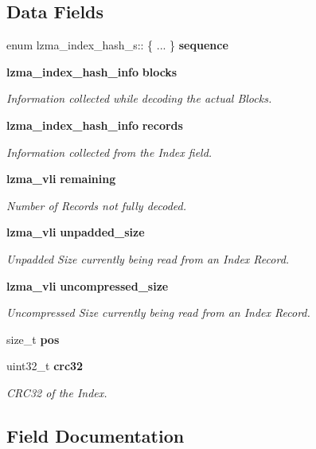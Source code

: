 \subsection*{Data Fields}
\begin{DoxyCompactItemize}
\item 
enum lzma\-\_\-index\-\_\-hash\-\_\-s\-:: \{ ... \}  {\bfseries sequence}\label{structlzma__index__hash__s_aa3d3ed57a6b0d9162ce567fa09eb57e7}

\item 
{\bf lzma\-\_\-index\-\_\-hash\-\_\-info} {\bf blocks}
\begin{DoxyCompactList}\small\item\em Information collected while decoding the actual Blocks. \end{DoxyCompactList}\item 
{\bf lzma\-\_\-index\-\_\-hash\-\_\-info} {\bf records}
\begin{DoxyCompactList}\small\item\em Information collected from the Index field. \end{DoxyCompactList}\item 
{\bf lzma\-\_\-vli} {\bf remaining}
\begin{DoxyCompactList}\small\item\em Number of Records not fully decoded. \end{DoxyCompactList}\item 
{\bf lzma\-\_\-vli} {\bf unpadded\-\_\-size}
\begin{DoxyCompactList}\small\item\em Unpadded Size currently being read from an Index Record. \end{DoxyCompactList}\item 
{\bf lzma\-\_\-vli} {\bf uncompressed\-\_\-size}
\begin{DoxyCompactList}\small\item\em Uncompressed Size currently being read from an Index Record. \end{DoxyCompactList}\item 
size\-\_\-t {\bf pos}
\item 
uint32\-\_\-t {\bf crc32}
\begin{DoxyCompactList}\small\item\em C\-R\-C32 of the Index. \end{DoxyCompactList}\end{DoxyCompactItemize}


\subsection{Field Documentation}
